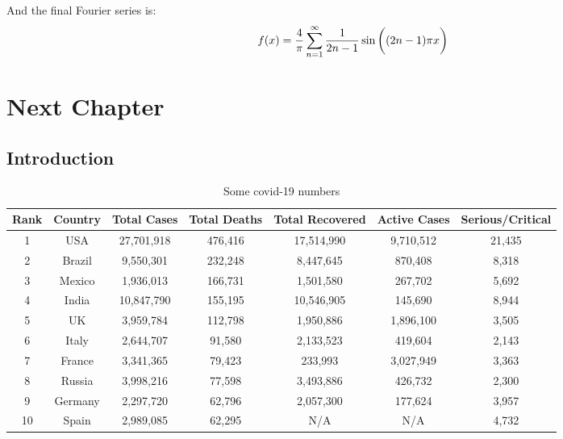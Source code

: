 \documentclass[11pt,letterpaper,twoside]{book}
\begin{document}
And the final Fourier series is:
\[
f(x) = \frac{4}{\pi} \sum^\infty_{n = 1} \frac{1}{2n - 1} \sin \left( (2n - 1) \pi \vphantom{\frac{1}{2}} x \right)
\]

\lipsum[16-17]


\chapter{Next Chapter}

\section{Introduction}

\lipsum[17-18]

\begin{table}
\centering
\begin{tabular}{||c|c|c|c|c|c|c||}
\hline\hline
Rank & Country & Total Cases & Total Deaths & Total Recovered & Active Cases & Serious/Critical	\\
\hline\hline
  1  & USA     & 27,701,918  &  476,416	    & 17,514,990      & 9,710,512    &  21,435	        \\
\hline
  2  & Brazil  &  9,550,301  &  232,248	    &  8,447,645      &   870,408    &   8,318	        \\
\hline
  3  & Mexico  &  1,936,013  &  166,731     &  1,501,580      &   267,702    &   5,692	        \\
\hline
  4  & India   & 10,847,790  &  155,195	    & 10,546,905      &   145,690    &   8,944   	\\
\hline
  5  & UK      &  3,959,784  &  112,798	    &  1,950,886      & 1,896,100    &   3,505	        \\
\hline
  6  & Italy   &  2,644,707  &   91,580     &  2,133,523      &   419,604    &   2,143	        \\
\hline
  7  & France  &  3,341,365  &   79,423	    &    233,993      & 3,027,949    &   3,363	        \\
\hline
  8  & Russia  &  3,998,216  &   77,598     &  3,493,886      &   426,732    &   2,300	        \\
\hline
  9  & Germany &  2,297,720  &   62,796	    &  2,057,300      &   177,624    &   3,957	        \\
\hline
  10 & Spain   &  2,989,085  &   62,295     &	 N/A          &     N/A	     &   4,732	        \\
\hline\hline
\end{tabular}
\caption{\label{tab:covidnums}Some covid-19 numbers}
\end{table}
\end{document}
